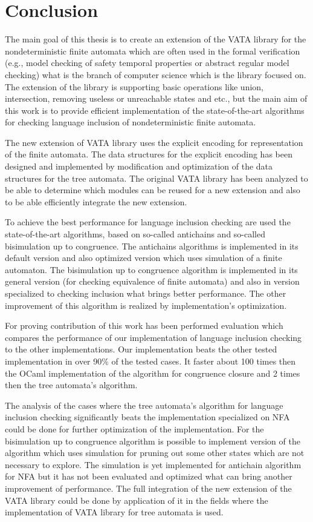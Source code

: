 \chapter{Conclusion}
\label{concl}
The main goal of this thesis is to create an extension of the VATA library for the nondeterministic finite automata 
which are often used in the formal verification (e.g., model checking of safety temporal properties or 
abstract regular model checking) what is the branch of computer science which is the library focused on. The extension of the library is supporting
basic operations like union, intersection, removing useless or unreachable states and etc., but the main aim of this work is to provide
efficient implementation of the state-of-the-art algorithms for checking language inclusion of nondeterministic finite automata.

The new extension of VATA library uses the explicit encoding for representation of the finite automata. 
The data structures for the explicit encoding has been designed
and implemented by modification and optimization of the data structures for the tree automata. The original VATA library has been analyzed to be able to determine
which modules can be reused for a new extension and also to be able efficiently integrate the new extension.

To achieve the best performance for language inclusion checking are used the state-of-the-art algorithms, based on so-called antichains and so-called bisimulation
up to congruence. The antichains algorithms is implemented in its default version and also optimized version which uses simulation of a finite automaton. 
The bisimulation up to congruence algorithm is implemented in its general version (for checking equivalence of finite automata) and also in
version specialized to checking inclusion what brings better performance. The other improvement of this algorithm is realized by implementation's optimization.

For proving contribution of this work has been performed evaluation which compares the performance of our implementation of language
inclusion checking to the other implementations. 
Our implementation beats the other tested implementation in over 90\% of the tested cases. It faster about 100 times then the OCaml implementation of the
algorithm for congruence closure and 2 times then the tree automata's algorithm.

The analysis of the cases where the tree automata's algorithm for language inclusion checking significantly 
beats the implementation specialized on NFA could be done for further optimization of the implementation. 
For the bisimulation up to congruence algorithm is possible to implement version of the algorithm 
which uses simulation for pruning out some other states which are not necessary to explore. The simulation is yet implemented for antichain algorithm for NFA but
it has not been evaluated and optimized what can bring another improvement of performance. The full integration of the new extension of the
VATA library could be done by application of it in the fields where the implementation of VATA library for tree automata is used.
